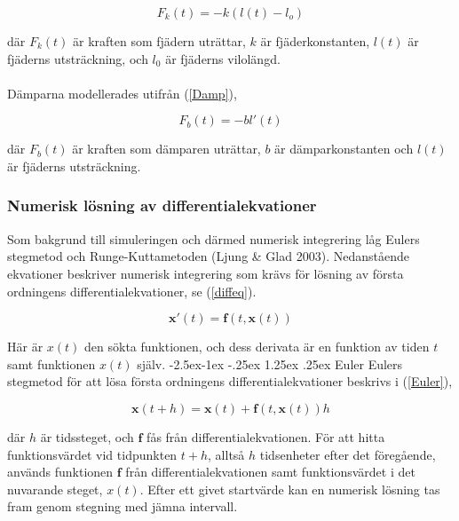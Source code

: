 \documentclass[a4paper,12pt,oneside,final,swedish]{extarticle}
\makeatletter
\renewcommand\paragraph{\@startsection{paragraph}{4}{\z@}%
            {-2.5ex\@plus -1ex \@minus -.25ex}%
            {1.25ex \@plus .25ex}%
            {\normalfont\normalsize\bfseries}}
\makeatother
\begin{document}
\begin{equation}
	{ F }_{ k }(t)=-k(l(t)-{ l }_{ o })
\label{Hooke}
\end{equation}

där $F_k(t)$ är kraften som fjädern uträttar, $k$ är fjäderkonstanten, $l(t)$ är fjäderns utsträckning, och $l_0$ är fjäderns vilolängd.
\\\\Dämparna modellerades utifrån (\ref{Damp}),

\begin{equation}
{ F }_{ b }(t)=-bl'(t)
\label{Damp}
\end{equation}

där $F_b(t)$ är kraften som dämparen uträttar, $b$ är dämparkonstanten och $l(t)$ är fjäderns utsträckning.

\subsubsection{Numerisk lösning av differentialekvationer}
Som bakgrund till simuleringen och därmed numerisk integrering låg Eulers stegmetod och Runge-Kuttametoden (Ljung \& Glad 2003). Nedanstående ekvationer beskriver numerisk integrering som krävs för lösning av första ordningens differentialekvationer, se (\ref{diffeq}).

\begin{equation}
\mathbf x'(t)=\mathbf f(t,\mathbf x(t))
\label{diffeq}
\end{equation}

Här är $x(t)$ den sökta funktionen, och dess derivata är en funktion av tiden $t$ samt funktionen $x(t)$ själv.
\paragraph{Euler}%
Eulers stegmetod för att lösa första ordningens differentialekvationer beskrivs i (\ref{Euler}),

\begin{equation}
\mathbf x(t+h)=\mathbf x(t)+\mathbf f(t,\mathbf x(t))h
\label{Euler}
\end{equation}

där $h$ är tidssteget, och \begin{math}\mathbf f \end{math} fås från differentialekvationen. För att hitta funktionsvärdet vid tidpunkten $t+h$, alltså $h$ tidsenheter efter det föregående, används funktionen \begin{math}\mathbf f \end{math} från differentialekvationen samt funktionsvärdet i det nuvarande steget, $x(t)$. Efter ett givet startvärde kan en numerisk lösning tas fram genom stegning med jämna intervall.
\end{document}
